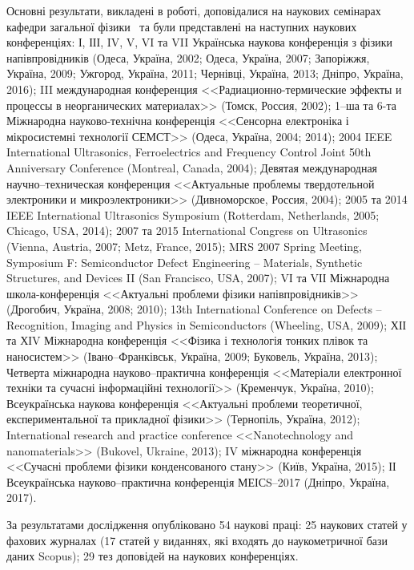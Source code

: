 {\probationTXT}
Основні результати, викладені в роботі, доповідалися на наукових семінарах
кафедри загальної фізики \thesisOfOrganization
~та були представлені на наступних наукових конференціях:
І, ІІІ, IV, V, VI та VII Українська наукова конференція з фізики напівпровідників
(Одеса, Україна, 2002; Одеса, Україна, 2007; Запоріжжя, Україна, 2009;
Ужгород, Україна, 2011; Чернівці, Україна, 2013; Дніпро, Україна, 2016);
III международная конференция <<Радиационно-термические эффекты и процессы в неорганических материалах>> (Томск, Россия, 2002);
1--ша та 6-та Міжнародна науково-технічна конференція <<Сенсорна електроніка і мікросистемні технології СЕМСТ>> (Одеса, Україна, 2004; 2014);
2004 IEEE International Ultrasonics, Ferroelectrics and Frequency Control Joint 50th Anniversary Conference (Montreal, Canada, 2004);
Девятая международная научно--техническая конференция <<Актуальные проблемы твердотельной электроники и микроэлектроники>> (Дивноморское, Россия, 2004);
2005 та 2014 IEEE International Ultrasonics Symposium (Rotterdam, Netherlands, 2005; Chicago, USA, 2014);
2007 та 2015 International Congress on Ultrasonics (Vienna, Austria, 2007; Metz, France, 2015);
MRS 2007 Spring Meeting, Symposium F: Semiconductor Defect Engineering -- Materials, Synthetic Structures, and Devices II (San Francisco, USA, 2007);
VІ та VІІ Міжнародна школа-конференція <<Актуальні проблеми фізики напівпровідників>> (Дрогобич, Україна, 2008; 2010);
13th International Conference on Defects – Recognition, Imaging and Physics in Semiconductors (Wheeling, USA, 2009);
ХІІ та ХІV Міжнародна конференція <<Фізика і технологія тонких плівок та наносистем>> (Івано--Франківськ, Україна, 2009; Буковель, Україна, 2013);
Четверта міжнародна науково--практична конференція <<Матеріали електронної техніки та сучасні інформаційні технології>> (Кременчук, Україна, 2010);
Всеукраїнська наукова конференція <<Актуальні проблеми теоретичної, експериментальної та прикладної фізики>> (Тернопіль, Україна, 2012);
International research and practice conference <<Nanotechnology and nanomaterials>> (Bukovel, Ukraine, 2013);
IV міжнародна конференція <<Сучасні проблеми фізики конденсованого стану>> (Київ, Україна, 2015);
ІІ Всеукраїнська науково--практична конференція МЕІСS--2017 (Дніпро, Україна, 2017).

{\publicationsTXT}
За результатами дослідження опубліковано 54 наукові праці:
 25 наукових статей
 у фахових журналах (17 статей у виданнях, які входять до наукометричної бази даних Scopus); 29 тез доповідей на наукових конференціях.


